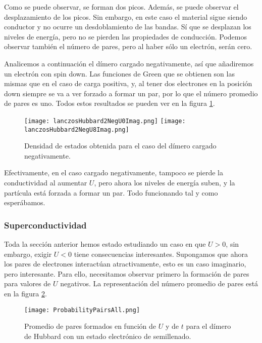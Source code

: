 \documentclass[12pt,twoside]{article}
\begin{document}
Como se puede observar, se forman dos picos. Además, se puede observar el desplazamiento de los picos. Sin embargo, en este caso el material sigue siendo conductor y no ocurre un desdoblamiento de las bandas. Sí que se desplazan los niveles de energía, pero no se pierden las propiedades de conducción. Podemos observar también el número de pares, pero al haber sólo un electrón, serán cero.

Analicemos a continuación el dímero cargado negativamente, así que añadiremos un electrón con spin down. Las funciones de Green que se obtienen son las mismas que en el caso de carga positiva, y, al tener dos electrones en la posición down siempre se va a ver forzado a formar un par, por lo que el número promedio de pares es uno. Todos estos resultados se pueden ver en la figura \ref{fig:negativeDimer}.
\begin{figure}[h!]
  \begin{center}
    \texttt{[image: lanczosHubbard2NegU0Imag.png]}
    \texttt{[image: lanczosHubbard2NegU8Imag.png]}
  \end{center}
  \caption{Densidad de estados obtenida para el caso del dímero cargado negativamente.}
  \label{fig:negativeDimer}
\end{figure}

Efectivamente, en el caso cargado negativamente, tampoco se pierde la conductividad al aumentar $U$, pero ahora los niveles de energía suben, y la partícula está forzada a formar un par. Todo funcionando tal y como esperábamos.
\subsubsection{Superconductividad}

Toda la sección anterior hemos estado estudiando un caso en que $U > 0$, sin embargo, exigir $U < 0$ tiene consecuencias interesantes. Supongamos que ahora los pares de electrones interactúan atractivamente, esto es un caso imaginario, pero interesante. Para ello, necesitamos observar primero la formación de pares para valores de $U$ negativos. La representación del número promedio de pares está en la figura \ref{fig:pairAverage}.
\begin{figure}[h!]
  \begin{center}
    \texttt{[image: ProbabilityPairsAll.png]}
  \end{center}
  \caption{Promedio de pares formados en función de $U$ y de $t$ para el dímero de Hubbard con un estado electrónico de semillenado.}
  \label{fig:pairAverage}
\end{figure}
\end{document}
